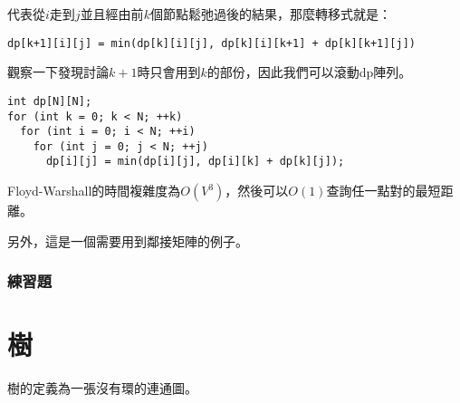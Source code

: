 代表從$i$走到$j$並且經由前$k$個節點鬆弛過後的結果，那麼轉移式就是：


\begin{center}
    \lstinline{dp[k+1][i][j] = min(dp[k][i][j], dp[k][i][k+1] + dp[k][k+1][j])}
\end{center}

\hspace*{\fill}

觀察一下發現討論$k+1$時只會用到$k$的部份，因此我們可以滾動dp陣列。


\clearpage

\begin{lstlisting}[caption=floyd warshall]
int dp[N][N];
for (int k = 0; k < N; ++k)
  for (int i = 0; i < N; ++i)
    for (int j = 0; j < N; ++j)
      dp[i][j] = min(dp[i][j], dp[i][k] + dp[k][j]);
\end{lstlisting}

Floyd-Warshall的時間複雜度為$O(V^3)$，然後可以$O(1)$查詢任一點對的最短距離。

另外，這是一個需要用到鄰接矩陣的例子。

\subsubsection{練習題}




\section{樹}

樹的定義為一張沒有環的連通圖。

